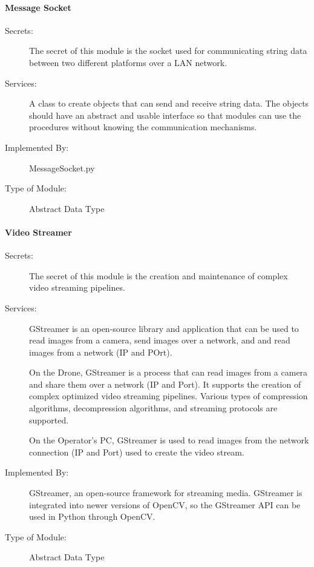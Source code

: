 \documentclass[12pt, titlepage]{article}
\begin{document}
\paragraph{Message Socket}
\label{Message Socket}
\begin{description}
\item[Secrets:] The secret of this module is the socket used for communicating string data between two
different platforms over a LAN network.
\item[Services:] A class to create objects that can send and receive string data. The objects should have an abstract and usable interface so that modules can use the procedures without knowing the communication mechanisms.
\item[Implemented By:] MessageSocket.py
\item[Type of Module:] Abstract Data Type
\end{description}

\paragraph{Video Streamer}
\label{Video Streamer}
\begin{description}
\item[Secrets:] The secret of this module is the creation and maintenance of complex video streaming pipelines.
\item[Services:] GStreamer is an open-source library and application that can be used to read images from a camera, send images over a network, and and read images from a network (IP and POrt).

On the Drone, GStreamer is a process that can read images from a camera and share them over a network (IP and Port). It supports the creation of complex optimized video streaming pipelines. Various types of  compression algorithms, decompression algorithms, and streaming protocols are supported.

On the Operator's PC, GStreamer is used to read images from the network connection (IP and Port) used to create the video stream.

\item[Implemented By:] GStreamer, an open-source framework for streaming media. GStreamer is integrated into newer versions of OpenCV, so the GStreamer API can be used in Python through OpenCV.
\item[Type of Module:] Abstract Data Type
\end{description}
\end{document}
